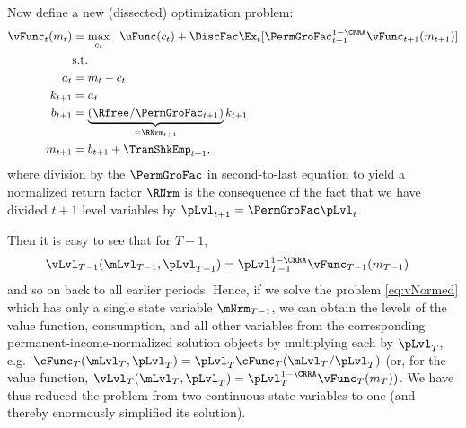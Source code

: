 Now define a new (dissected) optimization problem:
  \begin{equation}\begin{gathered}\begin{aligned}
        {\vFunc}_{t}({m}_{t}) & = \max_{{c}_{t}} ~~ \uFunc({c}_{t})+
        {\DiscFac}\Ex_{t}[ \PermGroFac_{t+1}^{1-\CRRA}{\vFunc}_{t+1}({m}_{t+1})] \label{eq:vNormed}                   \\
                                         & \text{s.t.}                                                                                 \\
        {a}_{t}                       & = {m}_{t}-{c}_{t}                                                                     \\
        {k}_{t+1}                     & = {a}_{t}                                                                                \\
        {b}_{t+1}                     & = \underbrace{\left(\Rfree/\PermGroFac_{t+1}\right)}_{\equiv \RNrm_{t+1}}{k}_{t+1} \\
        {m}_{t+1}                        & = {b}_{t+1}+\TranShkEmp_{t+1},
      \end{aligned}\end{gathered}\end{equation}
where division by the $\PermGroFac$ in second-to-last equation to yield a normalized return factor $\RNrm$ is the consequence of the fact that we have divided $t+1$ level variables by $\pLvl_{t+1}=\PermGroFac\pLvl_{t}$.

Then it is easy to see that for $T-1$, 
\begin{equation*}\begin{gathered}\begin{aligned}
      {\vLvl}_{T-1}(\mLvl_{T-1},\pLvl_{T-1}) & =  \pLvl_{T-1}^{1-\CRRA}{\vFunc}_{T-1}({m}_{T-1})
    \end{aligned}\end{gathered}\end{equation*}
and so on back to all earlier periods.  Hence, if we solve the problem \eqref{eq:vNormed} which has only a single state variable $\mNrm_{T-1}$, we can obtain the levels of the value function, consumption, and all other variables from the corresponding permanent-income-normalized solution objects by multiplying each by $\pLvl_{T}$, e.g.\ ${\cFunc}_{T}(\mLvl_{T},\pLvl_{T})=\pLvl_{T}\cFunc_{T}(\mLvl_{T}/\pLvl_{T})$ (or, for the value function, ${\vLvl} _{T}({\mLvl}_{T},\pLvl_{T}) = \pLvl_{T}^{1-\CRRA}\vFunc_{T}({m}_{T}))$.  We have thus reduced the problem from two continuous state variables to one (and thereby enormously simplified its solution).

